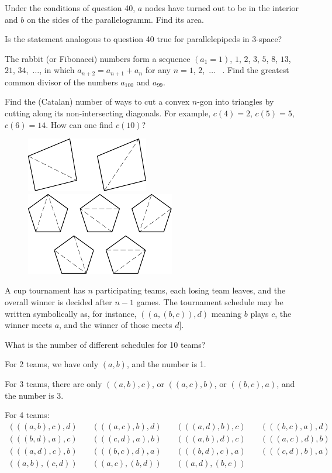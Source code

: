 \documentclass[12pt]{article}  %
\begin{document}
\medskip
{} Under the conditions of question 40, $a$ nodes have turned out to be in the interior and $b$ on the sides of the parallelogramm. Find its area. 

\bigskip
{} Is the statement analogous to question 40 true for parallelepipeds in 3-space?

\bigskip
{} The rabbit (or Fibonacci) numbers form a sequence $(a_1=1)$, $1$, $2$, $3$, $5$, $8$, $13$, $21$,
$34$,\nobreak\ $\dots$, in which $a_{n+2}=a_{n+1}+a_n$ for any
$n=1$, $2$,\nobreak\ $\dots$ \  . Find the greatest common divisor of the numbers $a_{100}$ and $a_{99}$.

\newpage
{} Find the (Catalan) number of ways to cut a convex $n$-gon into triangles by cutting along its non-intersecting diagonals. 
For example, $c(4)=2$, $c(5)=5$, $c(6)=14$. How can one find $c(10)$?
\begin{figure}[h]
\centering
\includegraphics[scale=1]{taskbook-281}
\hskip1cm\includegraphics[scale=1]{taskbook-282}
\end{figure}


{} A cup tournament has $n$ participating teams, each losing team leaves, and the overall winner is decided after $n-1$ games.
The tournament schedule may be written symbolically as, for instance,  $((a,(b,c)),d)$ meaning $b$ plays $c$, the winner meets $a$, and the winner of those meets $d$].

What is the number of different schedules for 10 teams? 

For 2 teams, we have only $(a,b)$, and the number is 1.

For 3 teams, there are only $((a,b),c)$, or $((a,c),b)$, or $((b,c),a)$, and the number is 3.

For 4 teams:
$$\begin{array}{cccc}
(((a,b),c),d) & \quad (((a,c),b),d) & \quad (((a,d),b),c) & \quad (((b,c),a),d) \\
(((b,d),a),c) & \quad (((c,d),a),b) & \quad (((a,b),d),c) & \quad (((a,c),d),b) \\ 
(((a,d),c),b) & \quad (((b,c),d),a) & \quad (((b,d),c),a) & \quad (((c,d),b),a) \\
((a,b),(c,d)) & \quad ((a,c),(b,d)) & \quad ((a,d),(b,c))
\end{array}$$
\end{document}
